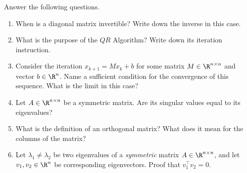 Answer the following questions.
\begin{enumerate}
	\item When is a diagonal matrix invertible? Write down the inverse in this case.
	
	\item What is the purpose of the $QR$ Algorithm? Write down its iteration instruction.
	
	\item Consider the iteration $x_{k+1} = Mx_k + b$ for some matrix $M \in \R^{n \times n}$ and vector $b \in \R^n$. Name a sufficient condition for the convergence of this sequence. What is the limit in this case?
	
	\item Let $A \in \R^{n \times n}$ be a symmetric matrix. Are its singular values equal to its eigenvalues?
	
	\item What is the definition of an orthogonal matrix? What does it mean for the columns of the matrix?
	
\item Let $\lambda_1 \neq \lambda_2$ be two eigenvalues of a \textit{symmetric} matrix $A \in \R^{n \times n}$, and let 
$v_1, v_2 \in \R^n$ be corresponding eigenvectors. Proof that $v_1^\top v_2 = 0$.
\end{enumerate}